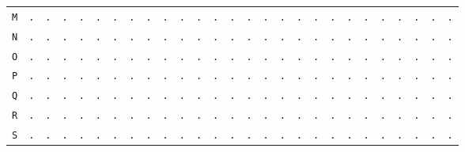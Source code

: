 \begin{figure}[H]
\begin{center}
{\begin{tabular}{c|cccccccccccccccccccccccccc}
				\texttt{M} & \texttt{.} & \texttt{.} & \texttt{.} & \texttt{.} & \texttt{.} & \texttt{.} & \texttt{.} & \texttt{.} & \texttt{.} & \texttt{.} & \texttt{.} & \texttt{.} & \texttt{.} & \texttt{.} & \texttt{.} & \texttt{.} & \texttt{.} & \texttt{.} & \texttt{.} & \texttt{.} & \texttt{.} & \texttt{.} & \texttt{.} & \texttt{.} & \texttt{.} & \texttt{.} \\
				\texttt{N} & \texttt{.} & \texttt{.} & \texttt{.} & \texttt{.} & \texttt{.} & \texttt{.} & \texttt{.} & \texttt{.} & \texttt{.} & \texttt{.} & \texttt{.} & \texttt{.} & \texttt{.} & \texttt{.} & \texttt{.} & \texttt{.} & \texttt{.} & \texttt{.} & \texttt{.} & \texttt{.} & \texttt{.} & \texttt{.} & \texttt{.} & \texttt{.} & \texttt{.} & \texttt{.} \\
				\texttt{O} & \texttt{.} & \texttt{.} & \texttt{.} & \texttt{.} & \texttt{.} & \texttt{.} & \texttt{.} & \texttt{.} & \texttt{.} & \texttt{.} & \texttt{.} & \texttt{.} & \texttt{.} & \texttt{.} & \texttt{.} & \texttt{.} & \texttt{.} & \texttt{.} & \texttt{.} & \texttt{.} & \texttt{.} & \texttt{.} & \texttt{.} & \texttt{.} & \texttt{.} & \texttt{.} \\
				\texttt{P} & \texttt{.} & \texttt{.} & \texttt{.} & \texttt{.} & \texttt{.} & \texttt{.} & \texttt{.} & \texttt{.} & \texttt{.} & \texttt{.} & \texttt{.} & \texttt{.} & \texttt{.} & \texttt{.} & \texttt{.} & \texttt{.} & \texttt{.} & \texttt{.} & \texttt{.} & \texttt{.} & \texttt{.} & \texttt{.} & \texttt{.} & \texttt{.} & \texttt{.} & \texttt{.} \\
				\texttt{Q} & \texttt{.} & \texttt{.} & \texttt{.} & \texttt{.} & \texttt{.} & \texttt{.} & \texttt{.} & \texttt{.} & \texttt{.} & \texttt{.} & \texttt{.} & \texttt{.} & \texttt{.} & \texttt{.} & \texttt{.} & \texttt{.} & \texttt{.} & \texttt{.} & \texttt{.} & \texttt{.} & \texttt{.} & \texttt{.} & \texttt{.} & \texttt{.} & \texttt{.} & \texttt{.} \\
				\texttt{R} & \texttt{.} & \texttt{.} & \texttt{.} & \texttt{.} & \texttt{.} & \texttt{.} & \texttt{.} & \texttt{.} & \texttt{.} & \texttt{.} & \texttt{.} & \texttt{.} & \texttt{.} & \texttt{.} & \texttt{.} & \texttt{.} & \texttt{.} & \texttt{.} & \texttt{.} & \texttt{.} & \texttt{.} & \texttt{.} & \texttt{.} & \texttt{.} & \texttt{.} & \texttt{.} \\
				\texttt{S} & \texttt{.} & \texttt{.} & \texttt{.} & \texttt{.} & \texttt{.} & \texttt{.} & \texttt{.} & \texttt{.} & \texttt{.} & \texttt{.} & \texttt{.} & \texttt{.} & \texttt{.} & \texttt{.} & \texttt{.} & \texttt{.} & \texttt{.} & \texttt{.} & \texttt{.} & \texttt{.} & \texttt{.} & \texttt{.} & \texttt{.} & \texttt{.} & \texttt{.} & \texttt{.} \\

\end{tabular}}
\end{center}
\end{figure}
